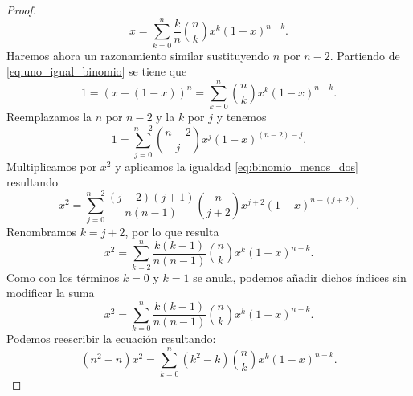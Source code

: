 \begin{proof}
    \begin{equation} \label{eq:desarrollo_binomio_uno}
        x = \sum_{k=0}^{n} \frac{k}{n} \binom{n}{k} x^{k} (1-x)^{n-k}.
    \end{equation}
    Haremos ahora un razonamiento similar sustituyendo $n$ por $n-2$.
    Partiendo de \eqref{eq:uno_igual_binomio} se tiene que 
    \begin{equation}
        1 = (x+ (1-x))^n = \sum_{k=0}^n \binom{n}{k} x^{k} (1-x)^{n-k}.
    \end{equation}
    Reemplazamos la $n$ por $n-2$ y la $k$ por $j$ y tenemos 
    \begin{equation}
        1 = \sum_{j=0}^{n-2} \binom{n-2}{j} x^{j} (1-x)^{(n-2)-j}.
    \end{equation}
    Multiplicamos por $x^2$ y aplicamos la igualdad \eqref{eq:binomio_menos_dos} resultando 
    \begin{equation}
        x^2 = \sum_{j=0}^{n-2} \frac{(j+2)(j+1)}{n(n-1)} \binom{n}{j+2} x^{j+2} (1-x)^{n-(j+2)}.
    \end{equation}
    Renombramos $k= j+2$, por lo que resulta
    \begin{equation}
        x^2 = \sum_{k=2}^{n} \frac{k(k-1)}{n(n-1)} \binom{n}{k} x^{k} (1-x)^{n-k}.
    \end{equation}
    Como con los términos $k=0$ y $k=1$ se anula, podemos añadir dichos índices sin modificar la suma 
    \begin{equation}
        x^2 = \sum_{k=0}^{n} \frac{k(k-1)}{n(n-1)} \binom{n}{k} x^{k} (1-x)^{n-k}.
    \end{equation}
    Podemos reescribir la ecuación resultando: 
    \begin{equation}\label{eq:desarrollo_binomio_dos}
      (n^2 - n)  x^2 = \sum_{k=0}^{n} (k^2 - k) \binom{n}{k} x^{k} (1-x)^{n-k}.
    \end{equation}
    
    


\end{proof}
